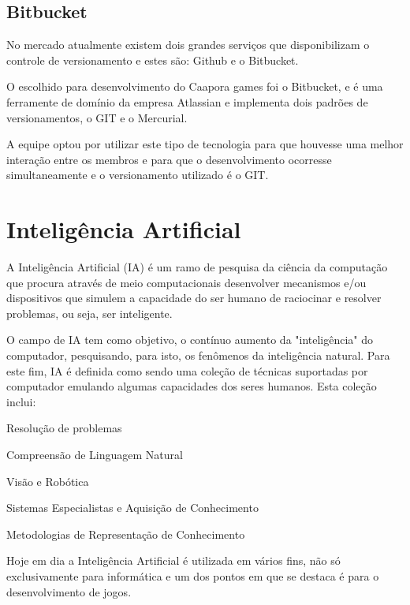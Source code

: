 	\subsection{Bitbucket}
	
No mercado atualmente existem dois grandes serviços que disponibilizam o controle de versionamento e estes são: Github e o Bitbucket.

O escolhido para desenvolvimento do Caapora games foi o Bitbucket, e é uma ferramente de domínio da empresa Atlassian e implementa dois padrões de versionamentos, o GIT e o Mercurial.


A equipe optou por utilizar este tipo de tecnologia para que houvesse uma melhor interação entre os membros e para que o desenvolvimento ocorresse simultaneamente e o
versionamento utilizado é o GIT.

\section{Inteligência Artificial}
\label{sec:inteligencia-artificial}

A Inteligência Artificial (IA) é um ramo de pesquisa da ciência da computação que procura através de meio computacionais desenvolver mecanismos e/ou dispositivos que simulem a capacidade do ser humano de raciocinar e resolver problemas, ou seja, ser inteligente. 

O campo de IA tem como objetivo, o contínuo aumento da "inteligência"  do computador, pesquisando, para isto, os fenômenos da inteligência natural. Para este fim, IA é definida  como sendo uma coleção de técnicas suportadas por computador emulando algumas capacidades dos seres humanos. Esta coleção inclui:

\begin{alineascomponto}
	
   \item Resolução de problemas
   \item Compreensão de Linguagem Natural
   \item Visão e Robótica
   \item Sistemas Especialistas e Aquisição de Conhecimento
   \item Metodologias de Representação de Conhecimento

	\end{alineascomponto}
	
Hoje em dia a Inteligência Artificial é utilizada em vários fins, não só exclusivamente para informática e um dos pontos em que se destaca é para o desenvolvimento de jogos. 

